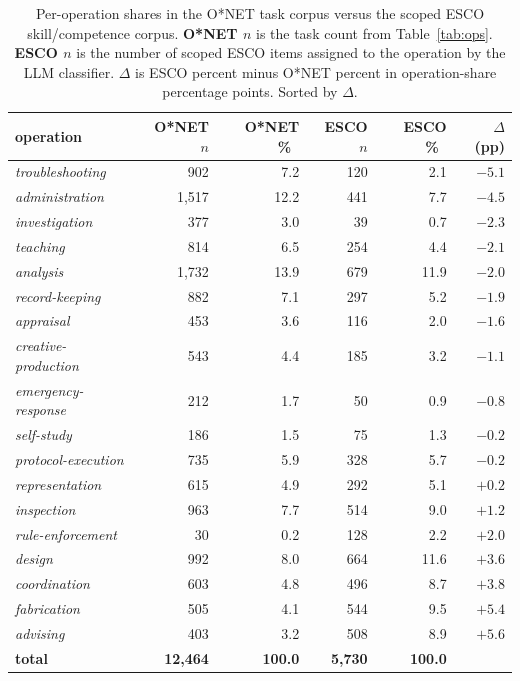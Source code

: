 \documentclass{article}
\begin{document}
\begin{table}[t]
\caption{Per-operation shares in the O{*}NET task corpus versus the
  scoped ESCO skill/competence corpus. \textbf{O{*}NET $n$} is the
  task count from Table~\ref{tab:ops}. \textbf{ESCO $n$} is the number
  of scoped ESCO items assigned to the operation by the LLM
  classifier. \textbf{$\Delta$} is ESCO percent minus
  O{*}NET percent in operation-share percentage points. Sorted by
  $\Delta$.}
\label{tab:esco_coverage}
\centering
\footnotesize
\begin{tabular}{lrrrrr}
\toprule
operation & O{*}NET $n$ & O{*}NET \%\ & ESCO $n$ & ESCO \%\ & $\Delta$ (pp) \\
\midrule
\emph{troubleshooting}      &    902 &  7.2 & 120 &  2.1 & $-5.1$ \\
\emph{administration}       & 1{,}517 & 12.2 & 441 &  7.7 & $-4.5$ \\
\emph{investigation}        &    377 &  3.0 &  39 &  0.7 & $-2.3$ \\
\emph{teaching}             &    814 &  6.5 & 254 &  4.4 & $-2.1$ \\
\emph{analysis}             & 1{,}732 & 13.9 & 679 & 11.9 & $-2.0$ \\
\emph{record-keeping}      &    882 &  7.1 & 297 &  5.2 & $-1.9$ \\
\emph{appraisal}            &    453 &  3.6 & 116 &  2.0 & $-1.6$ \\
\emph{creative-production} &    543 &  4.4 & 185 &  3.2 & $-1.1$ \\
\emph{emergency-response}  &    212 &  1.7 &  50 &  0.9 & $-0.8$ \\
\emph{self-study}          &    186 &  1.5 &  75 &  1.3 & $-0.2$ \\
\emph{protocol-execution}  &    735 &  5.9 & 328 &  5.7 & $-0.2$ \\
\emph{representation}       &    615 &  4.9 & 292 &  5.1 & $+0.2$ \\
\emph{inspection}           &    963 &  7.7 & 514 &  9.0 & $+1.2$ \\
\emph{rule-enforcement}    &     30 &  0.2 & 128 &  2.2 & $+2.0$ \\
\emph{design}               &    992 &  8.0 & 664 & 11.6 & $+3.6$ \\
\emph{coordination}         &    603 &  4.8 & 496 &  8.7 & $+3.8$ \\
\emph{fabrication}          &    505 &  4.1 & 544 &  9.5 & $+5.4$ \\
\emph{advising}             &    403 &  3.2 & 508 &  8.9 & $+5.6$ \\
\midrule
\textbf{total}                & \textbf{12{,}464} & \textbf{100.0} & \textbf{5{,}730} & \textbf{100.0} & \\
\bottomrule
\end{tabular}
\end{table}
\end{document}
